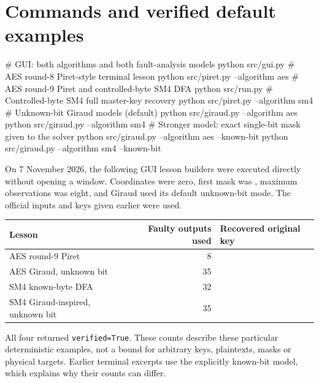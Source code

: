 \section{Commands and verified default examples}
\begin{lightcode}
# GUI: both algorithms and both fault-analysis models
python src/gui.py
# AES round-8 Piret-style terminal lesson
python src/piret.py --algorithm aes
# AES round-9 Piret and controlled-byte SM4 DFA
python src/run.py
# Controlled-byte SM4 full master-key recovery
python src/piret.py --algorithm sm4
# Unknown-bit Giraud models (default)
python src/giraud.py --algorithm aes
python src/giraud.py --algorithm sm4
# Stronger model: exact single-bit mask given to the solver
python src/giraud.py --algorithm aes --known-bit
python src/giraud.py --algorithm sm4 --known-bit
\end{lightcode}
On 7 November 2026, the following GUI lesson builders were executed directly without opening a window. Coordinates were zero, first mask was , maximum observations was eight, and Giraud used its default unknown-bit mode. The official inputs and keys given earlier were used.
\begin{center}
\small
\begin{tabular}{P{.34\linewidth}rl}
\toprule Lesson & Faulty outputs used & Recovered original key\\\midrule
AES round-9 Piret & 8 & \\
AES Giraud, unknown bit & 35 & \\
SM4 known-byte DFA & 32 & \\
SM4 Giraud-inspired, unknown bit & 35 & \\
\bottomrule
\end{tabular}
\end{center}
All four returned \texttt{verified=True}. These counts describe these particular deterministic examples, not a bound for arbitrary keys, plaintexts, masks or physical targets. Earlier terminal excerpts use the explicitly known-bit model, which explains why their counts can differ.

